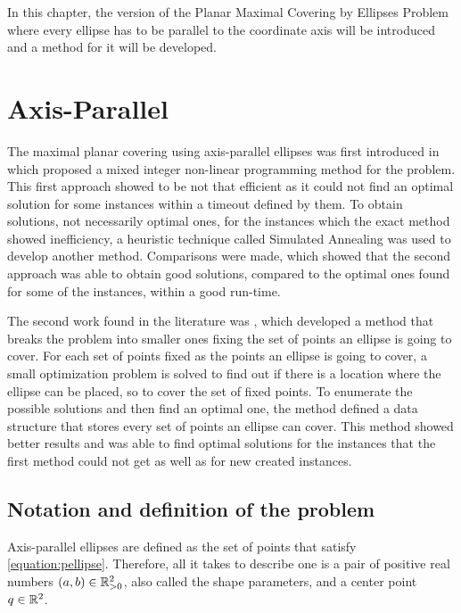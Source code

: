 In this chapter, the version of the Planar Maximal Covering by Ellipses Problem where every ellipse has to be parallel to the coordinate axis will be introduced and a method for it will be developed.

\section{Axis-Parallel}
The maximal planar covering using axis-parallel ellipses was first introduced in \cite{canbolat} which proposed a mixed integer non-linear programming method for the problem. This first approach showed to be not that efficient as it could not find an optimal solution for some instances within a timeout defined by them. To obtain solutions, not necessarily optimal ones, for the instances which the exact method showed inefficiency, a heuristic technique called Simulated Annealing was used to develop another method. Comparisons were made, which showed that the second approach was able to obtain good solutions, compared to the optimal ones found for some of the instances, within a good run-time.

The second work found in the literature was \cite{andreta}, which developed a method that breaks the problem into smaller ones fixing the set of points an ellipse is going to cover. For each set of points fixed as the points an ellipse is going to cover, a small optimization problem is solved to find out if there is a location where the ellipse can be placed, so to cover the set of fixed points. To enumerate the possible solutions and then find an optimal one, the method defined a data structure that stores every set of points an ellipse can cover. This method showed better results and was able to find optimal solutions for the instances that the first method could not get as well as for new created instances.

\subsection{Notation and definition of the problem}

Axis-parallel ellipses are defined as the set of points that satisfy \autoref{equation:pellipse}. Therefore, all it takes to describe one is a pair of positive real numbers $(a,b) \in \mathbb{R}_{>0}^2$, also called the shape parameters, and a center point $q \in \mathbb{R}^2$. 

